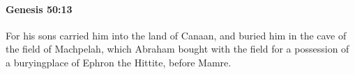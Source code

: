 
		\paragraph{Genesis 50:13} %
			\label{GENESIS-50-13}

			For his sons carried him into the land of Canaan, and buried him in the cave of the field of Machpelah, which Abraham bought with the field for a possession of a buryingplace of Ephron the Hittite, before Mamre.


